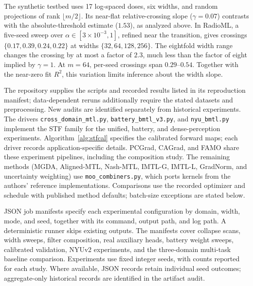 \documentclass{article}
\begin{document}
The synthetic testbed uses 17 log-spaced doses, six widths, and random projections of rank $\lfloor m/2\rfloor$. Its near-flat relative-crossing slope ($\gamma=0.07$) contrasts with the absolute-threshold estimate ($1.53$), as analyzed above. In RadioML, a five-seed sweep over $\alpha\in[3\times10^{-3},1]$, refined near the transition, gives crossings $\{0.17,0.39,0.24,0.22\}$ at widths $\{32,64,128,256\}$. The eightfold width range changes the crossing by at most a factor of $2.3$, much less than the factor of eight implied by $\gamma=1$. At $m=64$, per-seed crossings span $0.29$--$0.54$. Together with the near-zero fit $R^2$, this variation limits inference about the width slope.

The repository supplies the scripts and recorded results listed in its reproduction manifest; data-dependent reruns additionally require the stated datasets and preprocessing. New audits are identified separately from historical experiments.
The drivers \texttt{cross\_domain\_mtl.py}, \texttt{battery\_bmtl\_v3.py}, and \texttt{nyu\_bmtl.py} implement the STF family for the unified, battery, and dense-perception experiments. Algorithm~\ref{alg:stfcal} specifies the calibrated forward maps; each driver records application-specific details. PCGrad, CAGrad, and FAMO share these experiment pipelines, including the composition study. The remaining methods (MGDA, Aligned-MTL, Nash-MTL, IMTL-G, IMTL-L, GradNorm, and uncertainty weighting) use \texttt{moo\_combiners.py}, which ports kernels from the authors' reference implementations. Comparisons use the recorded optimizer and schedule with published method defaults; batch-size exceptions are stated below.

JSON job manifests specify each experimental configuration by domain, width, mode, and seed, together with its command, output path, and log path. A deterministic runner skips existing outputs. The manifests cover collapse scans, width sweeps, filter composition, real auxiliary heads, battery weight sweeps, calibrated validation, NYUv2 experiments, and the three-domain multi-task baseline comparison.
Experiments use fixed integer seeds, with counts reported for each study. Where available, JSON records retain individual seed outcomes; aggregate-only historical records are identified in the artifact audit.
\end{document}
